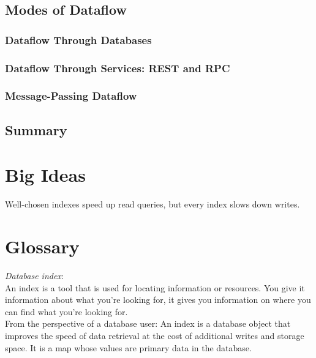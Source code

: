 \documentclass[12pt, titlepage]{article}
\begin{document}
\subsection{Modes of Dataflow}



\subsubsection{Dataflow Through Databases}



\subsubsection{Dataflow Through Services: REST and RPC}



\subsubsection{Message-Passing Dataflow}



\subsection{Summary}



\newpage
\appendix

\section{Big Ideas}

Well-chosen indexes speed up read queries, but every index slows down writes.

\section{Glossary}

\textit{Database index}: \\

An index is a tool that is used for locating information or resources. You give it information about what you're looking for, it gives you information on where you can find what you're looking for. \\

From the perspective of a database user: An index is a database object that improves the speed of data retrieval at the cost of additional writes and storage space. It is a map whose values are primary data in the database. \\
\end{document}
